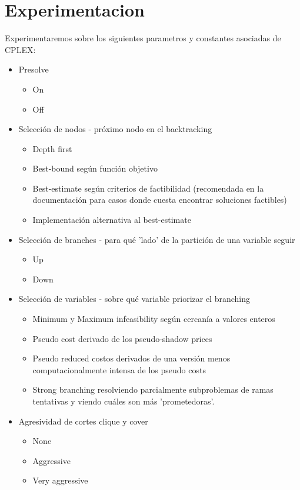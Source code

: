 \section{Experimentacion}

Experimentaremos sobre los siguientes parametros y constantes asociadas de CPLEX:
\begin{itemize}
    \item Presolve
        \begin{itemize}
            \item On
            \item Off
        \end{itemize}
    \item Selección de nodos - próximo nodo en el backtracking
        \begin{itemize}
            \item Depth first
            \item Best-bound según función objetivo
            \item Best-estimate según criterios de factibilidad (recomendada en la documentación para casos donde cuesta encontrar soluciones factibles)
            \item Implementación alternativa al best-estimate
        \end{itemize}
    \item Selección de branches - para qué 'lado' de la partición de una variable seguir
        \begin{itemize}
            \item Up
            \item Down
        \end{itemize}
    \item Selección de variables - sobre qué variable priorizar el branching
        \begin{itemize}
            \item Minimum y Maximum infeasibility según cercanía a valores enteros
            \item Pseudo cost derivado de los pseudo-shadow prices
            \item Pseudo reduced costos derivados de una versión menos computacionalmente intensa de los pseudo costs
            \item Strong branching resolviendo parcialmente subproblemas de ramas tentativas y viendo cuáles son más 'prometedoras'.
        \end{itemize}
    \item Agresividad de cortes clique y cover
        \begin{itemize}
        \item None
        \item Aggressive
        \item Very aggressive
        \end{itemize}
\end{itemize}

